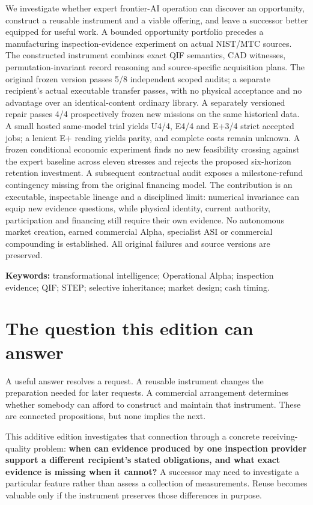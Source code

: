 \documentclass[
  11pt,
]{article}
\let\OriginalSection\section
\renewcommand{\section}{\needspace{5\baselineskip}\OriginalSection}
\begin{document}
We investigate whether expert frontier-AI operation can discover an
opportunity, construct a reusable instrument and a viable offering, and
leave a successor better equipped for useful work. A bounded opportunity
portfolio precedes a manufacturing inspection-evidence experiment on
actual NIST/MTC sources. The constructed instrument combines exact QIF
semantics, CAD witnesses, permutation-invariant record reasoning and
source-specific acquisition plans. The original frozen version passes
5/8 independent scoped audits; a separate recipient's actual executable
transfer passes, with no physical acceptance and no advantage over an
identical-content ordinary library. A separately versioned repair passes
4/4 prospectively frozen new missions on the same historical data. A
small hosted same-model trial yields U4/4, E4/4 and E+3/4 strict
accepted jobs; a lenient E+ reading yields parity, and complete costs
remain unknown. A frozen conditional economic experiment finds no new
feasibility crossing against the expert baseline across eleven stresses
and rejects the proposed six-horizon retention investment. A subsequent
contractual audit exposes a milestone-refund contingency missing from
the original financing model. The contribution is an executable,
inspectable lineage and a disciplined limit: numerical invariance can
equip new evidence questions, while physical identity, current
authority, participation and financing still require their own evidence.
No autonomous market creation, earned commercial Alpha, specialist ASI
or commercial compounding is established. All original failures and
source versions are preserved.

\textbf{Keywords:} transformational intelligence; Operational Alpha;
inspection evidence; QIF; STEP; selective inheritance; market design;
cash timing.

\hypertarget{the-question-this-edition-can-answer}{%
\section{The question this edition can
answer}\label{the-question-this-edition-can-answer}}

A useful answer resolves a request. A reusable instrument changes the
preparation needed for later requests. A commercial arrangement
determines whether somebody can afford to construct and maintain that
instrument. These are connected propositions, but none implies the next.

This additive edition investigates that connection through a concrete
receiving- quality problem: \textbf{when can evidence produced by one
inspection provider support a different recipient's stated obligations,
and what exact evidence is missing when it cannot?} A successor may need
to investigate a particular feature rather than assess a collection of
measurements. Reuse becomes valuable only if the instrument preserves
those differences in purpose.
\end{document}
